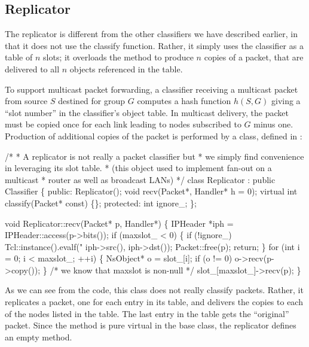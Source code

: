 \subsection{Replicator}
\label{sec:node:replicator}

The replicator is different from the other classifiers
we have described earlier,
in that it does not use the classify function.
Rather, it simply uses the classifier as a table of $n$ slots;
it overloads the  method to produce $n$ copies
of a packet, that are delivered to all $n$ objects referenced in the table.

To support multicast packet forwarding, a classifier receiving a
multicast packet from source $S$
destined for group $G$ computes a hash function $h(S,G)$ giving
a ``slot number'' in the classifier's object table.
In multicast delivery, the packet must be copied once for
each link leading to nodes subscribed to $G$ minus one.
Production of additional copies of the packet is performed
by a  class, defined in :
\begin{program}
        /*
         * {\cf A replicator is not really a packet classifier but}
         * {\cf we simply find convenience in leveraging its slot table.}
         * {\cf (this object used to implement fan-out on a multicast}
         * {\cf router as well as broadcast LANs)}
         */
        class Replicator : public Classifier \{
        public:
                Replicator();
                void recv(Packet*, Handler* h = 0);
                virtual int classify(Packet* const) \{\};
        protected:
                int ignore_;
        \};

        void Replicator::recv(Packet* p, Handler*)
        \{
                IPHeader *iph = IPHeader::access(p->bits());
                if (maxslot_ < 0) \{
                        if (!ignore_)
                                Tcl::instance().evalf("%
                                        iph->src(), iph->dst());
                        Packet::free(p);
                        return;
                \}
                for (int i = 0; i < maxslot_; ++i) \{
                        NsObject* o = slot_[i];
                        if (o != 0)
                                o->recv(p->copy());
                \}
                /* {\cf we know that maxslot is non-null} */
                slot_[maxslot_]->recv(p);
        \}
\end{program}
As we can see from the code,
this class  does not really classify packets.
Rather, it replicates a packet, one for each entry in its table,
and delivers the copies to each of the nodes listed in the table.
The last entry in the table gets the ``original'' packet.
Since the  method is pure virtual in the base class,
the replicator defines an empty  method.


